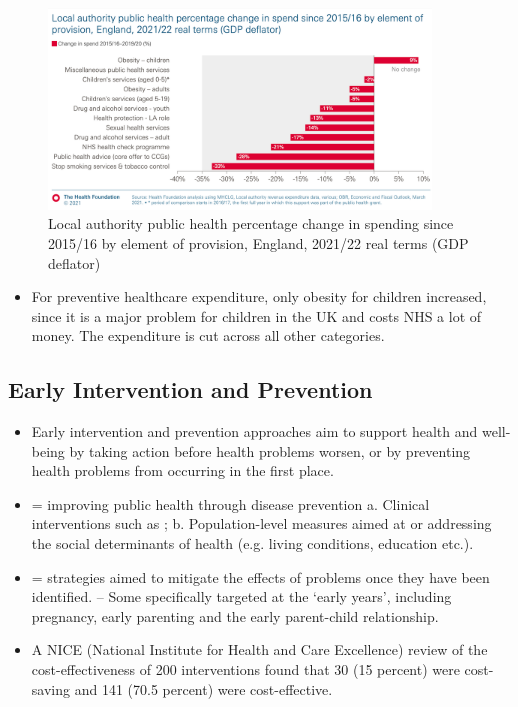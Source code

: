         \begin{figure}[H]%
                \centering
                \includegraphics[width=4in]{images/ch3/21.png}
                \caption{Local authority public health percentage change in spending since 2015/16 by element of provision, England, 2021/22 real terms (GDP deflator)}
            \end{figure}
\begin{itemize}           
        \item For preventive healthcare expenditure, only obesity for children increased, since it is a major problem for children in the UK and costs NHS a lot of money. The expenditure is cut across all other categories.
        \end{itemize} 

        \subsection{Early Intervention and Prevention}
\begin{itemize}           
        \item Early intervention and prevention approaches aim to support health and well-being by taking action before health problems worsen, or by preventing health problems from occurring in the first place. 
        \item {} = improving public health through disease prevention
        a. Clinical interventions such as ;
        b. Population-level measures aimed at  or addressing the social determinants of health (e.g. living conditions, education etc.).
        \item {} = strategies aimed to mitigate the effects of problems once they have been identified.
        – Some specifically targeted at the ‘early years’, including pregnancy, early parenting and the early parent-child relationship.
        \item A NICE (National Institute for Health and Care Excellence) review of the cost-effectiveness of 200 interventions found that 30 (15 percent) were cost-saving and 141 (70.5 percent) were cost-effective.
        \end{itemize} 


